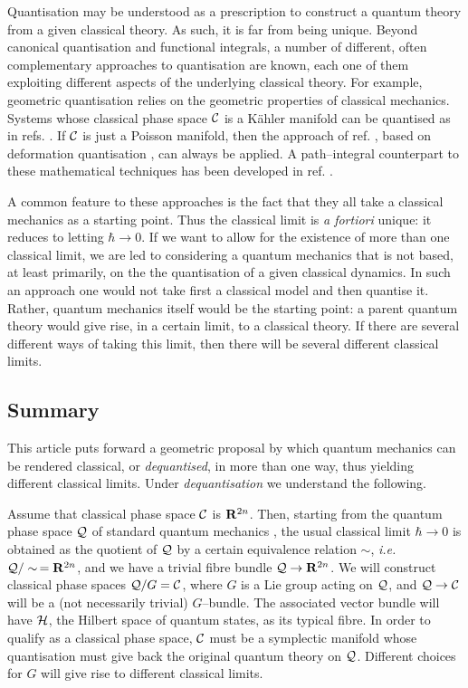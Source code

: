 \documentclass[a4paper,a4paper]{article}
\begin{document}
Quantisation may be understood as a prescription to construct a quantum theory from a given 
classical theory. As such, it is far from being unique. Beyond canonical quantisation 
and functional integrals, a number of  different, often complementary approaches 
to quantisation are known, each one of them exploiting different aspects of the underlying 
classical theory. For example, geometric quantisation \cite{KOSTANT, SOURIAU, 
SNIA, WOODHOUSE} relies on the geometric properties of classical mechanics. 
Systems whose classical phase space 
${\cal C}$ is a K\"ahler manifold can be quantised as in refs. \cite{BEREZIN, SCHLICHENMAIER, RT}. 
If ${\cal C}$ is just a Poisson manifold, then the  approach of ref. \cite{KONTSEVICH}, 
based on deformation quantisation \cite{STERNHEIMER, ZACHOS}, can always  be applied. 
A path--integral counterpart to these mathematical techniques has been developed 
in ref. \cite{CATFELDER}.

A common feature to these approaches is the fact that they all take a classical mechanics 
as a starting point. Thus the classical limit is {\it a fortiori} unique: it reduces to 
letting $\hbar\to 0$. If we want to allow for the existence of more than one classical limit, 
we are led to considering a quantum mechanics that is not based, at least primarily, 
on the the quantisation of a given classical dynamics. In such an approach 
one would not take first a classical model and then quantise it. Rather, 
quantum mechanics itself would be the starting point: a parent quantum theory
would give rise, in a certain limit, to a classical theory. 
If there are several different ways of taking this limit, 
then there will be several different classical limits. 

\subsection{Summary}\label{suma}

This article puts forward a geometric proposal by which quantum mechanics 
can be rendered classical, or {\it dequantised}, in more than one way, 
thus yielding different classical limits. Under {\it dequantisation} 
we understand the following. 

Assume that classical phase space ${\cal C}$ is ${\bf R}^{2n}$. Then,
starting from the quantum phase space ${\cal Q}$ of standard quantum mechanics 
\cite{ASHTEKAR}, the usual classical limit $\hbar\to 0$ is obtained as the quotient 
of ${\cal Q}$ by a certain equivalence relation $\sim$, {\it i.e.}
${\cal Q}/\sim\,={\bf R}^{2n}$,
and we have a trivial fibre bundle ${\cal Q}\rightarrow {\bf R}^{2n}$. 
We will construct classical phase spaces ${\cal Q}/G={\cal C}$, 
where $G$ is a Lie group acting on ${\cal Q}$, and ${\cal Q}\rightarrow {\cal C}$ 
will be a (not necessarily trivial) $G$--bundle. The associated vector 
bundle will have ${\cal H}$, the Hilbert space of quantum states, as its 
typical fibre. In order to qualify as a classical 
phase space, ${\cal C}$ must be a symplectic manifold whose quantisation must give back 
the original quantum theory on ${\cal Q}$. Different choices for $G$ will give rise to 
different classical limits. 
\end{document}
